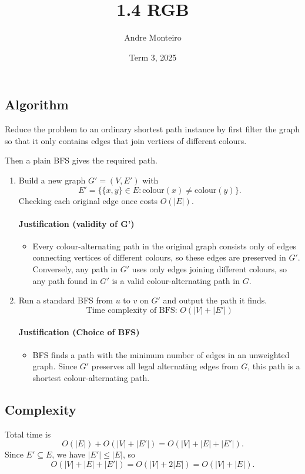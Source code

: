 \documentclass[12pt]{article}
\title{1.4 RGB}
\author{Andre Monteiro}
\date{Term 3, 2025}
\begin{document}
\maketitle
\newpage

\subsection*{Algorithm}
Reduce the problem to an ordinary shortest path instance by first filter the graph so that it only contains edges that join vertices of different colours.  


Then a plain BFS gives the required path.  
\begin{enumerate}
\item Build a new graph \(G'=(V,E')\) with
\[
E'=\{\{x,y\}\in E : \mathrm{colour}(x)\neq \mathrm{colour}(y)\}.
\]
Checking each original edge once costs \(O(|E|)\).
\paragraph{Justification (validity of G')}
\begin{itemize}
    \item Every colour-alternating path in the original graph consists only of edges connecting vertices of different colours, so these edges are preserved in \(G'\). Conversely, any path in \(G'\) uses only edges joining different colours, so any path found in \(G'\) is a valid colour-alternating path in \(G\).
\end{itemize}
\item Run a standard BFS from \(u\) to \(v\) on \(G'\) and output the path it finds.
\[
\text{Time complexity of BFS: } O(|V| + |E'|)
\]
\paragraph{Justification (Choice of BFS)}
\begin{itemize}
\item BFS finds a path with the minimum number of edges in an unweighted graph. Since \(G'\) preserves all legal alternating edges from \(G\), this path is a shortest colour-alternating path.
\end{itemize}


\end{enumerate}

\subsection*{Complexity}
Total time is
\[
O(|E|) + O(|V| + |E'|)
= O(|V| + |E| + |E'|).
\]
Since \(E' \subseteq E\), we have \(|E'|\le |E|\), so
\[
O(|V| + |E| + |E'|) = O(|V| + 2|E|) = O(|V| + |E|).
\]
\newpage
\end{document}
